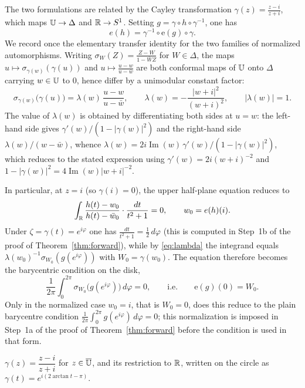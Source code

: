 The two formulations are related by the Cayley transformation $\gamma(z) = \frac{z-i}{z+i}$, which maps $\mathbb{U} \to \Delta$ and $\mathbb{R} \to S^1$. Setting $g = \gamma \circ h \circ \gamma^{-1}$, one has
\[
e(h) = \gamma^{-1} \circ \mathrm{e}(g) \circ \gamma.
\]
We record once the elementary transfer identity for the two families of
normalized automorphisms. Writing $\sigma_W(Z)=\frac{Z-W}{1-\overline WZ}$ for
$W\in\Delta$, the maps $u\mapsto\sigma_{\gamma(w)}(\gamma(u))$ and
$u\mapsto\frac{u-w}{u-\bar w}$ are both conformal maps of $\mathbb{U}$ onto $\Delta$
carrying $w\in\mathbb{U}$ to $0$, hence differ by a unimodular constant factor:
\begin{equation}\label{eq:lambda}
	\sigma_{\gamma(w)}\bigl(\gamma(u)\bigr)=\lambda(w)\,\frac{u-w}{u-\bar w},
	\qquad
	\lambda(w)=-\frac{|w+i|^2}{(w+i)^2},\qquad |\lambda(w)|=1 .
\end{equation}
The value of $\lambda(w)$ is obtained by differentiating both sides at $u=w$:
the left-hand side gives $\gamma'(w)/(1-|\gamma(w)|^2)$ and the right-hand side
$\lambda(w)/(w-\bar w)$, whence
$\lambda(w)=2i\operatorname{Im}(w)\,\gamma'(w)/(1-|\gamma(w)|^2)$, which reduces
to the stated expression using $\gamma'(w)=2i(w+i)^{-2}$ and
$1-|\gamma(w)|^2=4\operatorname{Im}(w)|w+i|^{-2}$.

In particular, at $z = i$ (so $\gamma(i) = 0$), the upper half-plane equation reduces to
\[
\int_{\mathbb{R}} \frac{h(t) - w_0}{h(t) - \bar{w}_0} \cdot \frac{dt}{t^2 + 1} = 0, \qquad w_0 = e(h)(i).
\]
Under $\zeta = \gamma(t) = e^{i\varphi}$ one has $\frac{dt}{t^2+1}=\frac12\,d\varphi$
(this is computed in Step~1b of the proof of Theorem~\ref{thm:forward}), while by
\eqref{eq:lambda} the integrand equals $\lambda(w_0)^{-1}\sigma_{W_0}(g(e^{i\varphi}))$
with $W_0=\gamma(w_0)$. The equation therefore becomes the barycentric condition
on the disk,
\[
\frac{1}{2\pi}\int_0^{2\pi}\sigma_{W_0}\bigl(g(e^{i\varphi})\bigr)\,d\varphi=0 ,
\qquad\text{i.e.}\qquad \mathrm{e}(g)(0)=W_0 .
\]
Only in the normalized case $w_0=i$, that is $W_0=0$, does this reduce to the
plain barycentre condition $\frac{1}{2\pi}\int_0^{2\pi}g(e^{i\varphi})\,d\varphi=0$;
this normalization is imposed in Step~1a of the proof of
Theorem~\ref{thm:forward} before the condition is used in that form.

\begin{definition}\label{def:cayley}
	$\gamma(z)=\dfrac{z-i}{z+i}$ for $z\in\overline{\mathbb{U}}$, and its restriction to $\mathbb{R}$,
	written on the circle as $\gamma(t)=e^{i(2\arctan t-\pi)}$.
\end{definition}

